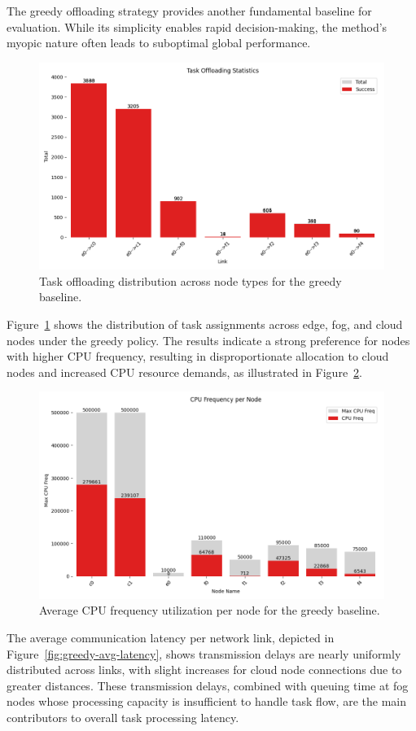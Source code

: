 \documentclass[preprint,3p,authoryear]{elsarticle}
\begin{document}
The greedy offloading strategy provides another fundamental baseline for evaluation. While its simplicity enables rapid decision-making, the method's myopic nature often leads to suboptimal global performance.

\begin{figure}[H]
    \centering
    \includegraphics[width=0.5\linewidth]{figs/Greedy/task_offloading_statistics.png}
    \caption{Task offloading distribution across node types for the greedy baseline.}
    \label{fig:greedy-task-offloading-stats}
\end{figure}

Figure~\ref{fig:greedy-task-offloading-stats} shows the distribution of task assignments across edge, fog, and cloud nodes under the greedy policy. The results indicate a strong preference for nodes with higher CPU frequency, resulting in disproportionate allocation to cloud nodes and increased CPU resource demands, as illustrated in Figure~\ref{fig:greedy-cpu-freq}.

\begin{figure}[H]
    \centering
    \includegraphics[width=0.5\linewidth]{figs/Greedy/cpu_frequency_per_node.png}
    \caption{Average CPU frequency utilization per node for the greedy baseline.}
    \label{fig:greedy-cpu-freq}
\end{figure}

The average communication latency per network link, depicted in Figure~\ref{fig:greedy-avg-latency}, shows transmission delays are nearly uniformly distributed across links, with slight increases for cloud node connections due to greater distances. These transmission delays, combined with queuing time at fog nodes whose processing capacity is insufficient to handle task flow, are the main contributors to overall task processing latency.
\end{document}
